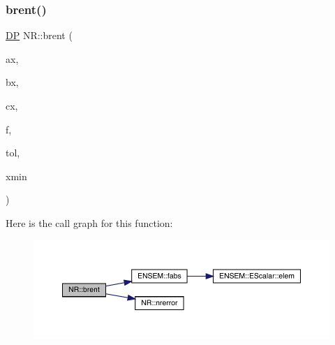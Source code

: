 \mbox{\label{namespaceNR_aff9bab8f86d05c799cb643f8d3f4727b}} 
\subsubsection{\texorpdfstring{brent()}{brent()}\hspace{0.1cm}{\footnotesize\ttfamily [1/2]}}
{\footnotesize\ttfamily \mbox{\hyperlink{namespaceNR_af6ff762dd605ff477b8e52387253a02a}{DP}} N\+R\+::brent (\begin{DoxyParamCaption}\item[{const \mbox{\hyperlink{namespaceNR_af6ff762dd605ff477b8e52387253a02a}{DP}}}]{ax,  }\item[{const \mbox{\hyperlink{namespaceNR_af6ff762dd605ff477b8e52387253a02a}{DP}}}]{bx,  }\item[{const \mbox{\hyperlink{namespaceNR_af6ff762dd605ff477b8e52387253a02a}{DP}}}]{cx,  }\item[{const \mbox{\hyperlink{classNR_1_1ScalFunc}{Scal\+Func}} \&}]{f,  }\item[{const \mbox{\hyperlink{namespaceNR_af6ff762dd605ff477b8e52387253a02a}{DP}}}]{tol,  }\item[{\mbox{\hyperlink{namespaceNR_af6ff762dd605ff477b8e52387253a02a}{DP}} \&}]{xmin }\end{DoxyParamCaption})}

Here is the call graph for this function\+:\nopagebreak
\begin{figure}[H]
\begin{center}
\leavevmode
\includegraphics[width=350pt]{da/d46/namespaceNR_aff9bab8f86d05c799cb643f8d3f4727b_cgraph}
\end{center}
\end{figure}
\mbox{\label{namespaceNR_a949db0b9cc65ac1f2224f5c48384f58a}} 
